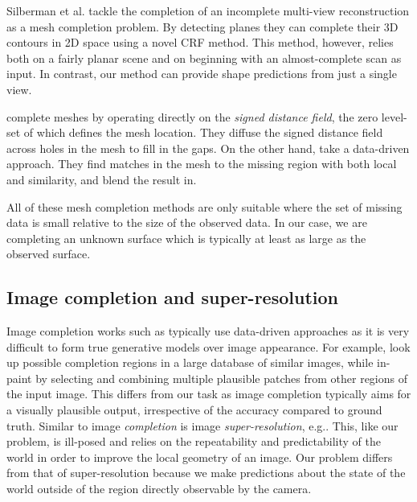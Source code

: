 \documentclass[10pt,twocolumn,letterpaper]{article}
\makeatletter
\renewcommand*{\eg}{e.g.\@\xspace}
\newcommand*{\ea}{et al.\@\xspace}
\makeatother
\begin{document}
Silberman \ea \cite{silberman-eccv-2014} tackle the completion of an incomplete multi-view reconstruction as a mesh completion problem.
By detecting planes they can complete their 3D contours in 2D space using a novel CRF method.
This method, however, relies both on a fairly planar scene and on beginning with an almost-complete scan as input.
In contrast, our method can provide shape predictions from just a single view.

\cite{davis-3dpvt-2002} complete meshes by operating directly on the \emph{signed distance field}, the zero level-set of which defines the mesh location. They diffuse the signed distance field across holes in the mesh to fill in the gaps.
On the other hand, \cite{harary-tog-2013} take a data-driven approach.
They find matches in the mesh to the missing region with both local and similarity, and blend the result in.

All of these mesh completion methods are only suitable where the set of missing data is small relative to the size of the observed data.
In our case, we are completing an unknown surface which is typically at least as large as the observed surface.



\subsection{Image completion and super-resolution}

Image completion works such as \cite{hays-siggraph-2007, criminisi-cvpr-2003}
typically use data-driven approaches as it is very difficult to form true generative models over image appearance.
For example, \cite{hays-siggraph-2007} look up possible completion regions in a large database of similar images, while \cite{criminisi-cvpr-2003} in-paint by selecting and combining multiple plausible patches from other regions of the input image.
This differs from our task as image completion typically aims for a visually plausible output, irrespective of the accuracy compared to ground truth.
Similar to image \emph{completion} is image \emph{super-resolution}, \eg \cite{macaodha-eccv-2012, dong-eccv-2014}. 
This, like our problem, is ill-posed and relies on the repeatability and predictability of the world in order to improve the local geometry of an image.
Our problem differs from that of super-resolution because we make predictions about the state of the world outside of the region directly observable by the camera.
\end{document}
